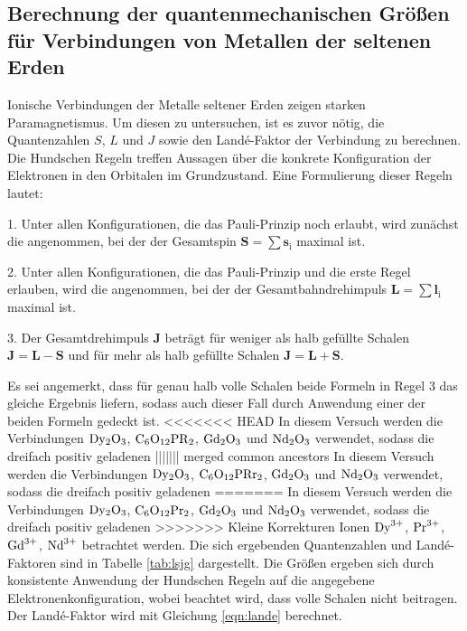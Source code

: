 \subsection{Berechnung der quantenmechanischen Größen für Verbindungen von Metallen der seltenen Erden}
\label{subsec:berechnungquantenzahlenundlande}
Ionische Verbindungen der Metalle seltener Erden zeigen starken Paramagnetismus.
Um diesen zu untersuchen, ist es zuvor nötig, die Quantenzahlen $S$, $L$ und $J$ sowie
den Landé-Faktor der Verbindung zu berechnen. Die Hundschen Regeln treffen Aussagen
über die konkrete Konfiguration der Elektronen in den Orbitalen im Grundzustand.
Eine Formulierung dieser Regeln lautet:

1. Unter allen Konfigurationen, die das Pauli-Prinzip noch erlaubt, wird zunächst die
angenommen, bei der der Gesamtspin $\symbf{S} = \sum \symbf{s}_{\text{i}}$ maximal ist.

2. Unter allen Konfigurationen, die das Pauli-Prinzip und die erste Regel erlauben, wird
die angenommen, bei der der Gesamtbahndrehimpuls $\symbf{L} = \sum \symbf{l}_{\text{i}}$
maximal ist.

3. Der Gesamtdrehimpuls $\symbf{J}$ beträgt für weniger als halb gefüllte Schalen
$\symbf{J} = \symbf{L} - \symbf{S}$ und für mehr als halb gefüllte Schalen
$\symbf{J} = \symbf{L} + \symbf{S}$.

Es sei angemerkt, dass für genau halb volle Schalen beide Formeln in Regel 3 das gleiche
Ergebnis liefern, sodass auch dieser Fall durch Anwendung einer der beiden Formeln
gedeckt ist.
<<<<<<< HEAD
In diesem Versuch werden die Verbindungen $\ce{Dy2O3}$, $\ce{C6O12PR2}$, $\ce{Gd2O3}$ und $\ce{Nd2O3}$ verwendet, sodass die dreifach positiv geladenen
||||||| merged common ancestors
In diesem Versuch werden die Verbindungen $\ce{Dy2O3}$, $\ce{C6O12PRr2}$, $\ce{Gd2O3}$ und $\ce{Nd2O3}$ verwendet, sodass die dreifach positiv geladenen
=======
In diesem Versuch werden die Verbindungen $\ce{Dy2O3}$, $\ce{C6O12Pr2}$, $\ce{Gd2O3}$ und $\ce{Nd2O3}$ verwendet, sodass die dreifach positiv geladenen
>>>>>>> Kleine Korrekturen
Ionen $\ce{Dy^{3+}}$, $\ce{Pr^{3+}}$, $\ce{Gd^{3+}}$, $\ce{Nd^{3+}}$ betrachtet werden.
Die sich ergebenden Quantenzahlen und Landé-Faktoren sind in Tabelle \ref{tab:lsjg}
dargestellt. Die Größen ergeben sich durch konsistente Anwendung der Hundschen Regeln
auf die angegebene Elektronenkonfiguration, wobei beachtet wird, dass volle Schalen nicht beitragen.
Der Landé-Faktor wird mit Gleichung \eqref{eqn:lande} berechnet.

